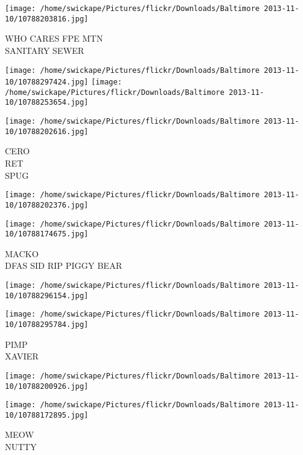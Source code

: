 \documentclass[10pt,letterpaper]{article}
\begin{document}
\vspace{0.25in}
\texttt{[image: /home/swickape/Pictures/flickr/Downloads/Baltimore 2013-11-10/10788203816.jpg]}

WHO CARES FPE MTN\\
SANITARY SEWER\\
\pagebreak

\texttt{[image: /home/swickape/Pictures/flickr/Downloads/Baltimore 2013-11-10/10788297424.jpg]}
\texttt{[image: /home/swickape/Pictures/flickr/Downloads/Baltimore 2013-11-10/10788253654.jpg]}

\vspace{0.25in}
\texttt{[image: /home/swickape/Pictures/flickr/Downloads/Baltimore 2013-11-10/10788202616.jpg]}

CERO\\
RET\\
SPUG\\
\pagebreak

\texttt{[image: /home/swickape/Pictures/flickr/Downloads/Baltimore 2013-11-10/10788202376.jpg]}

\vspace{0.25in}
\texttt{[image: /home/swickape/Pictures/flickr/Downloads/Baltimore 2013-11-10/10788174675.jpg]}

MACKO\\
DFAS SID RIP PIGGY BEAR\\
\pagebreak

\texttt{[image: /home/swickape/Pictures/flickr/Downloads/Baltimore 2013-11-10/10788296154.jpg]}

\vspace{0.25in}
\texttt{[image: /home/swickape/Pictures/flickr/Downloads/Baltimore 2013-11-10/10788295784.jpg]}

PIMP\\
XAVIER\\
\pagebreak

\texttt{[image: /home/swickape/Pictures/flickr/Downloads/Baltimore 2013-11-10/10788200926.jpg]}

\vspace{0.25in}
\texttt{[image: /home/swickape/Pictures/flickr/Downloads/Baltimore 2013-11-10/10788172895.jpg]}

MEOW\\
NUTTY\\
\pagebreak
\end{document}
